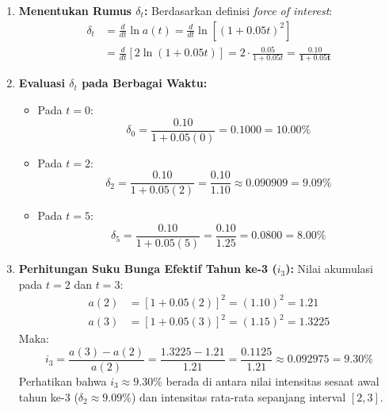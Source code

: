 \documentclass[11pt,a4paper]{article}
\begin{document}
\begin{solutionbox}[Soal 5]
\begin{enumerate}[label=(\alph*)]
    \item \textbf{Menentukan Rumus $\delta_t$:}
    Berdasarkan definisi \textit{force of interest}:
    \begin{align*}
        \delta_t &= \frac{d}{dt} \ln a(t) = \frac{d}{dt} \ln \left[(1 + 0.05t)^2\right] \\
                 &= \frac{d}{dt} \left[ 2 \ln(1 + 0.05t) \right] = 2 \cdot \frac{0.05}{1 + 0.05t} = \mathbf{\frac{0.10}{1 + 0.05t}}
    \end{align*}

    \item \textbf{Evaluasi $\delta_t$ pada Berbagai Waktu:}
    \begin{itemize}
        \item Pada $t = 0$:
        \begin{equation*}
            \delta_0 = \frac{0.10}{1 + 0.05(0)} = 0.1000 = \mathbf{10.00\%}
        \end{equation*}
        \item Pada $t = 2$:
        \begin{equation*}
            \delta_2 = \frac{0.10}{1 + 0.05(2)} = \frac{0.10}{1.10} \approx 0.090909 = \mathbf{9.09\%}
        \end{equation*}
        \item Pada $t = 5$:
        \begin{equation*}
            \delta_5 = \frac{0.10}{1 + 0.05(5)} = \frac{0.10}{1.25} = 0.0800 = \mathbf{8.00\%}
        \end{equation*}
    \end{itemize}

    \item \textbf{Perhitungan Suku Bunga Efektif Tahun ke-3 ($i_3$):}
    Nilai akumulasi pada $t = 2$ dan $t = 3$:
    \begin{align*}
        a(2) &= [1 + 0.05(2)]^2 = (1.10)^2 = 1.21 \\
        a(3) &= [1 + 0.05(3)]^2 = (1.15)^2 = 1.3225
    \end{align*}
    Maka:
    \begin{equation*}
        i_3 = \frac{a(3) - a(2)}{a(2)} = \frac{1.3225 - 1.21}{1.21} = \frac{0.1125}{1.21} \approx 0.092975 = \mathbf{9.30\%}
    \end{equation*}
    Perhatikan bahwa $i_3 \approx 9.30\%$ berada di antara nilai intensitas sesaat awal tahun ke-3 ($\delta_2 \approx 9.09\%$) dan intensitas rata-rata sepanjang interval $[2, 3]$.
\end{enumerate}
\end{solutionbox}
\end{document}
